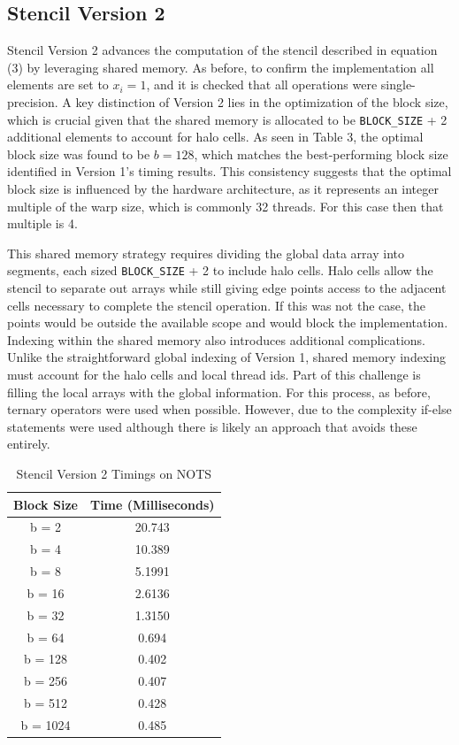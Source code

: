\documentclass{article}
\begin{document}
\subsection{Stencil Version 2}

Stencil Version 2 advances the computation of the stencil described in equation (3) by leveraging shared memory. As before, to confirm the implementation all elements are set to $x_i = 1$, and it is checked that all operations were single-precision. A key distinction of Version 2 lies in the optimization of the block size, which is crucial given that the shared memory is allocated to be \texttt{BLOCK\_SIZE} + 2 additional elements to account for halo cells. As seen in Table 3, the optimal block size was found to be $b = 128$, which matches the best-performing block size identified in Version 1's timing results. This consistency suggests that the optimal block size is influenced by the hardware architecture, as it represents an integer multiple of the warp size, which is commonly 32 threads. For this case then that multiple is 4.

\bigskip
\noindent
This shared memory strategy requires dividing the global data array into segments, each sized \texttt{BLOCK\_SIZE} + 2 to include halo cells. Halo cells allow the stencil to separate out arrays while still giving edge points access to the adjacent cells necessary to complete the stencil operation. If this was not the case, the points would be outside the available scope and would block the implementation. Indexing within the shared memory also introduces additional complications. Unlike the straightforward global indexing of Version 1, shared memory indexing must account for the halo cells and local thread ids. Part of this challenge is filling the local arrays with the global information. For this process, as before, ternary operators were used when possible. However, due to the complexity if-else statements were used although there is likely an approach that avoids these entirely. 

\begin{table}[ht!]
    \caption{Stencil Version 2 Timings on NOTS}
    \centering
    \begin{tabular}{|c|c|}
        \hline
        Block Size & Time (Milliseconds) \\
        \hline
        b = 2 & 20.743\\
        \hline
        b = 4 & 10.389\\
        \hline
        b = 8 & 5.1991\\
        \hline
        b = 16 & 2.6136\\
        \hline
        b = 32 & 1.3150\\
        \hline
        b = 64 & 0.694\\
        \hline
        b = 128 & 0.402\\
        \hline
        b = 256 & 0.407\\
        \hline
        b = 512 & 0.428\\
        \hline
        b = 1024 & 0.485\\
        \hline
    \end{tabular}
\end{table}
\end{document}
